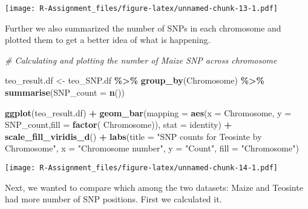 \documentclass[
]{article}
\newenvironment{Shaded}{\begin{snugshade}}{\end{snugshade}}
\newcommand{\AttributeTok}[1]{\textcolor[rgb]{0.13,0.29,0.53}{#1}}
\newcommand{\CommentTok}[1]{\textcolor[rgb]{0.56,0.35,0.01}{\textit{#1}}}
\newcommand{\FunctionTok}[1]{\textcolor[rgb]{0.13,0.29,0.53}{\textbf{#1}}}
\newcommand{\NormalTok}[1]{#1}
\newcommand{\OtherTok}[1]{\textcolor[rgb]{0.56,0.35,0.01}{#1}}
\newcommand{\SpecialCharTok}[1]{\textcolor[rgb]{0.81,0.36,0.00}{\textbf{#1}}}
\newcommand{\StringTok}[1]{\textcolor[rgb]{0.31,0.60,0.02}{#1}}
\begin{document}
\texttt{[image: R-Assignment\_files/figure-latex/unnamed-chunk-13-1.pdf]}

Further we also summarized the number of SNPs in each chromosome and
plotted them to get a better idea of what is happening.

\begin{Shaded}
\begin{Highlighting}[]
\CommentTok{\# Calculating and plotting the number of Maize SNP across chromosome}

\NormalTok{teo\_result.df }\OtherTok{\textless{}{-}}\NormalTok{ teo\_SNP.df }\SpecialCharTok{\%\textgreater{}\%}
  \FunctionTok{group\_by}\NormalTok{(Chromosome) }\SpecialCharTok{\%\textgreater{}\%}
  \FunctionTok{summarise}\NormalTok{(}\AttributeTok{SNP\_count =} \FunctionTok{n}\NormalTok{())}


\FunctionTok{ggplot}\NormalTok{(teo\_result.df) }\SpecialCharTok{+}
  \FunctionTok{geom\_bar}\NormalTok{(}\AttributeTok{mapping =} \FunctionTok{aes}\NormalTok{(}\AttributeTok{x =}\NormalTok{ Chromosome, }\AttributeTok{y =}\NormalTok{ SNP\_count,}\AttributeTok{fill =} \FunctionTok{factor}\NormalTok{( Chromosome)), }\AttributeTok{stat =} \StringTok{\textquotesingle{}identity\textquotesingle{}}\NormalTok{) }\SpecialCharTok{+} \FunctionTok{scale\_fill\_viridis\_d}\NormalTok{() }\SpecialCharTok{+}
  \FunctionTok{labs}\NormalTok{(}\AttributeTok{title =} \StringTok{"SNP counts for Teosinte by Chromosome"}\NormalTok{,}
       \AttributeTok{x =} \StringTok{"Chromosome number"}\NormalTok{,}
       \AttributeTok{y =} \StringTok{"Count"}\NormalTok{,}
       \AttributeTok{fill =} \StringTok{"Chromosome"}\NormalTok{)}
\end{Highlighting}
\end{Shaded}

\texttt{[image: R-Assignment\_files/figure-latex/unnamed-chunk-14-1.pdf]}

Next, we wanted to compare which among the two datasets: Maize and
Teosinte had more number of SNP positions. First we calculated it.
\end{document}
